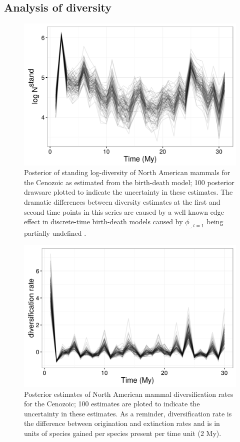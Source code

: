 \documentclass[12pt,letterpaper]{article}
\begin{document}
\subsection*{Analysis of diversity}
\begin{figure}[ht]
  \centering
  \includegraphics[width=\textwidth,height=0.8\textheight,keepaspectratio=true]{figure/log_diversity}
  \caption[Estimated mammal log-diversity for the Cenozoic]{Posterior of standing log-diversity of North American mammals for the Cenozoic as estimated from the birth-death model; 100 posterior drawsare plotted to indicate the uncertainty in these estimates. The dramatic differences between diversity estimates at the first and second time points in this series are caused by a well known edge effect in discrete-time birth-death models caused by \(\phi_{\_, t = 1}\) being partially undefined \citep{Royle2008}.}
  \label{fig:diversity_est}
\end{figure}

\begin{figure}[ht]
  \centering
  \includegraphics[width=\textwidth,height=0.8\textheight,keepaspectratio=true]{figure/div_rate}
  \caption[Mammal diversification rate estimtes]{Posterior estimates of North American mammal diversification rates for the Cenozoic; 100 estimates are ploted to indicate the uncertainty in these estimates. As a reminder, diversification rate is the difference between origination and extinction rates and is in units of species gained per species present per time unit (2 My).}
  \label{fig:diversity_rate}
\end{figure}
\end{document}
